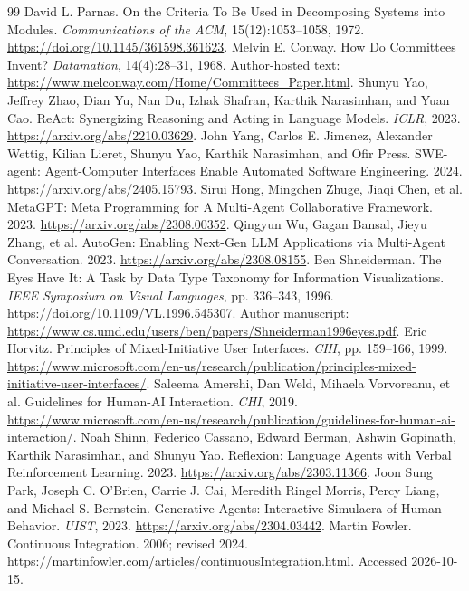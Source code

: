 \begin{thebibliography}{99}
\small
{} David L. Parnas. On the Criteria To Be Used in Decomposing Systems into Modules. \emph{Communications of the ACM}, 15(12):1053--1058, 1972. \url{https://doi.org/10.1145/361598.361623}.
 Melvin E. Conway. How Do Committees Invent? \emph{Datamation}, 14(4):28--31, 1968. Author-hosted text: \url{https://www.melconway.com/Home/Committees_Paper.html}.
 Shunyu Yao, Jeffrey Zhao, Dian Yu, Nan Du, Izhak Shafran, Karthik Narasimhan, and Yuan Cao. ReAct: Synergizing Reasoning and Acting in Language Models. \emph{ICLR}, 2023. \url{https://arxiv.org/abs/2210.03629}.
 John Yang, Carlos E. Jimenez, Alexander Wettig, Kilian Lieret, Shunyu Yao, Karthik Narasimhan, and Ofir Press. SWE-agent: Agent-Computer Interfaces Enable Automated Software Engineering. 2024. \url{https://arxiv.org/abs/2405.15793}.
 Sirui Hong, Mingchen Zhuge, Jiaqi Chen, et al. MetaGPT: Meta Programming for A Multi-Agent Collaborative Framework. 2023. \url{https://arxiv.org/abs/2308.00352}.
 Qingyun Wu, Gagan Bansal, Jieyu Zhang, et al. AutoGen: Enabling Next-Gen LLM Applications via Multi-Agent Conversation. 2023. \url{https://arxiv.org/abs/2308.08155}.
 Ben Shneiderman. The Eyes Have It: A Task by Data Type Taxonomy for Information Visualizations. \emph{IEEE Symposium on Visual Languages}, pp. 336--343, 1996. \url{https://doi.org/10.1109/VL.1996.545307}. Author manuscript: \url{https://www.cs.umd.edu/users/ben/papers/Shneiderman1996eyes.pdf}.
 Eric Horvitz. Principles of Mixed-Initiative User Interfaces. \emph{CHI}, pp. 159--166, 1999. \url{https://www.microsoft.com/en-us/research/publication/principles-mixed-initiative-user-interfaces/}.
 Saleema Amershi, Dan Weld, Mihaela Vorvoreanu, et al. Guidelines for Human-AI Interaction. \emph{CHI}, 2019. \url{https://www.microsoft.com/en-us/research/publication/guidelines-for-human-ai-interaction/}.
 Noah Shinn, Federico Cassano, Edward Berman, Ashwin Gopinath, Karthik Narasimhan, and Shunyu Yao. Reflexion: Language Agents with Verbal Reinforcement Learning. 2023. \url{https://arxiv.org/abs/2303.11366}.
 Joon Sung Park, Joseph C. O'Brien, Carrie J. Cai, Meredith Ringel Morris, Percy Liang, and Michael S. Bernstein. Generative Agents: Interactive Simulacra of Human Behavior. \emph{UIST}, 2023. \url{https://arxiv.org/abs/2304.03442}.
 Martin Fowler. Continuous Integration. 2006; revised 2024. \url{https://martinfowler.com/articles/continuousIntegration.html}. Accessed 2026-10-15.

\end{thebibliography}
